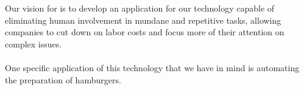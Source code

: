 Our vision for \productname{} is to develop an application for our technology capable of eliminating human involvement in mundane and repetitive tasks, allowing companies to cut down on labor costs and focus more of their attention on complex issues.\\
\\
One specific application of this technology that we have in mind is automating the preparation of hamburgers.